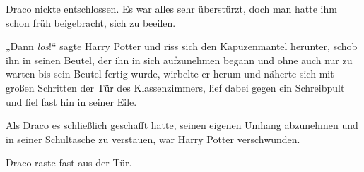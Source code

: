 Draco nickte entschlossen. Es war alles sehr überstürzt, doch man hatte ihm schon früh beigebracht, sich zu beeilen.

„Dann \emph{los}!“ sagte Harry Potter und riss sich den Kapuzenmantel herunter, schob ihn in seinen Beutel, der ihn in sich aufzunehmen begann und ohne auch nur zu warten bis sein Beutel fertig wurde, wirbelte er herum und näherte sich mit großen Schritten der Tür des Klassenzimmers, lief dabei gegen ein Schreibpult und fiel fast hin in seiner Eile.

Als Draco es schließlich geschafft hatte, seinen eigenen Umhang abzunehmen und in seiner Schultasche zu verstauen, war Harry Potter verschwunden.

Draco raste fast aus der Tür.

